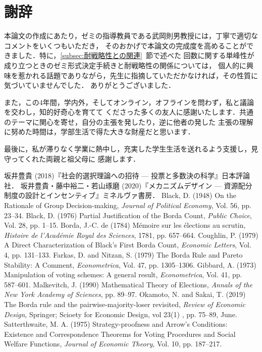 \documentclass[dvipdfmx]{jsarticle}
\begin{document}
  \newpage
  \section*{謝辞}
  本論文の作成にあたり，ゼミの指導教員である武岡則男教授には，丁寧で適切なコメントをいくつもいただき，
  そのおかげで本論文の完成度を高めることができました．特に，\ref{subsec:耐戦略性との関連}~節で述べた
  回数に関する単峰性が成り立つときのゼミ形式決定手続きと耐戦略性の関係については，
  個人的に興味を惹かれる話題でありながら，先生に指摘していただかなければ，その性質に気づいていませんでした．
  ありがとうございました．

  また，この4年間，学内外，そしてオンライン，オフラインを問わず，私と議論を交わし，知的好奇心を育てて
  くださった多くの友人に感謝いたします．共通のテーマに関心を寄せ，自分の主張を発したり，逆に他者の発した
  主張の理解に努めた時間は，学部生活で得た大きな財産だと思います．

  最後に，私が滞りなく学業に熱中し，充実した学生生活を送れるよう支援し，見守ってくれた両親と祖父母に
  感謝します．



\newpage
\begin{thebibliography}{9}
  坂井豊貴 (2018)『社会的選択理論への招待 --- 投票と多数決の科学』日本評論社．
  坂井豊貴・藤中裕二・若山琢磨 (2020)『メカニズムデザイン --- 資源配分制度の設計とインセンティブ』ミネルヴァ書房．
  Black, D. (1948) On the Rationale of Group Decision-making, \textit{Journal of Political Economy},
  Vol. 56, pp. 23--34.
  Black, D. (1976) Partial Justification of the Borda Count, \textit{Public Choice},
  Vol. 28, pp. 1--15.
  Borda, J.-C. de (1784) M\'{e}moire sur les \'{e}lections au scrutin, \textit{Histoire de l'Acad\'{e}mie
  Royal des Sciences}, 1781, pp. 657--664.
  Coughlin, P. (1979) A Direct Characterization of Black's First Borda Count,
  \textit{Economic Letters}, Vol. 4, pp. 131--133.
  Farkas, D. and Nitzan, S. (1979) The Borda Rule and Pareto Stability: A Comment,
  \textit{Econometrica}, Vol. 47, pp. 1305--1306.
  Gibbard, A. (1973) Manipulation of voting schemes: A general result, \textit{Econometrica}, Vol. 41,
  pp. 587--601.
    Malkevitch, J. (1990) Mathematical Theory of Elections, \textit{Annals of the New York
    Academy of Sciences}, pp. 89--97.
  Okamoto, N. and Sakai, T. (2019) The Borda rule and the pairwise-majority-loser
  revisited, \textit{Review of Economic Design}, Springer; Scioety for Economic Design, vol 23(1)
  , pp. 75--89, June.
  Satterthwaite, M. A. (1975) Strategy-proofness and Arrow's Conditions:
  Existence and Correspondence Theorems for Voting Procedures and Social
  Welfare Functions, \textit{Journal of Economic Theory}, Vol. 10, pp. 187--217.
\end{thebibliography}
\end{document}

